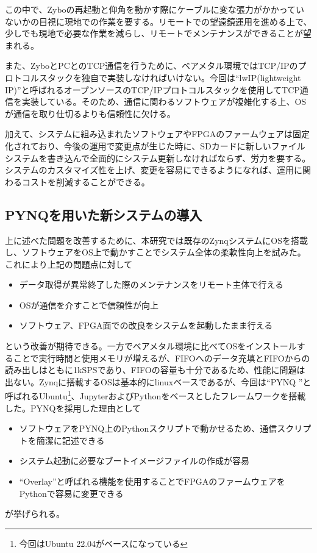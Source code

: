 この中で、Zyboの再起動と仰角を動かす際にケーブルに変な張力がかかっていないかの目視に現地での作業を要する。リモートでの望遠鏡運用を進める上で、少しでも現地で必要な作業を減らし、リモートでメンテナンスができることが望まれる。

また、ZyboとPCとのTCP通信を行うために、ベアメタル環境ではTCP/IPのプロトコルスタックを独自で実装しなければいけない。今回は``lwIP(lightweight IP)''と呼ばれるオープンソースのTCP/IPプロトコルスタックを使用してTCP通信を実装している。そのため、通信に関わるソフトウェアが複雑化する上、OSが通信を取り仕切るよりも信頼性に欠ける。

加えて、システムに組み込まれたソフトウェアやFPGAのファームウェアは固定化されており、今後の運用で変更点が生じた時に、SDカードに新しいファイルシステムを書き込んで全面的にシステム更新しなければならず、労力を要する。システムのカスタマイズ性を上げ、変更を容易にできるようになれば、運用に関わるコストを削減することができる。

\subsection{PYNQを用いた新システムの導入}
上に述べた問題を改善するために、本研究では既存のZynqシステムにOSを搭載し、ソフトウェアをOS上で動かすことでシステム全体の柔軟性向上を試みた。これにより上記の問題点に対して
\begin{itemize}
  \item データ取得が異常終了した際のメンテナンスをリモート主体で行える
  \item OSが通信を介すことで信頼性が向上
  \item ソフトウェア、FPGA面での改良をシステムを起動したまま行える
\end{itemize}
という改善が期待できる。一方でベアメタル環境に比べてOSをインストールすることで実行時間と使用メモリが増えるが、FIFOへのデータ充填とFIFOからの読み出しはともに1kSPSであり、FIFOの容量も十分であるため、性能に問題は出ない。Zynqに搭載するOSは基本的にlinuxベースであるが、今回は``PYNQ \cite{Pynq}''と呼ばれるUbuntu\footnote{今回はUbuntu 22.04がベースになっている}、JupyterおよびPythonをベースとしたフレームワークを搭載した。PYNQを採用した理由として
\begin{itemize}
  \item ソフトウェアをPYNQ上のPythonスクリプトで動かせるため、通信スクリプトを簡潔に記述できる
  \item システム起動に必要なブートイメージファイルの作成が容易
  \item ``Overlay''と呼ばれる機能を使用することでFPGAのファームウェアをPythonで容易に変更できる
\end{itemize}
が挙げられる。

